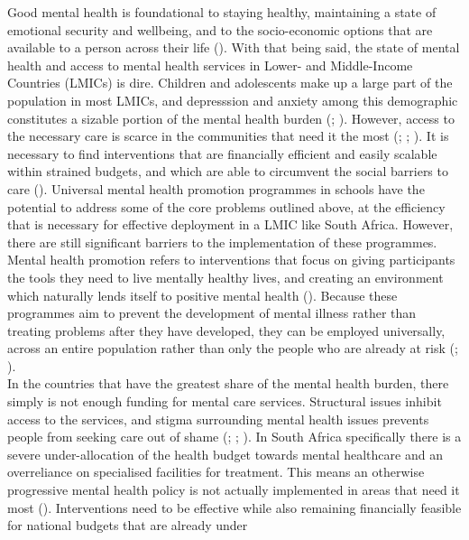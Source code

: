 \documentclass[fontsize=14bp]{article}
\begin{document}
\noindent
Good mental health is foundational to staying healthy, maintaining a state of
emotional security and wellbeing, and to the socio-economic options that are
available to a person across their life (\cite{barryetal13}). With that being
said, the state of mental health and access to mental health services in Lower-
and Middle-Income Countries (LMICs) is dire. Children and adolescents make up
a large part of the population in most LMICs, and depresssion and anxiety among
this demographic constitutes a sizable portion of the mental health burden
(\cite{barryetal13}; \cite{Oseral21}). However, access to the necessary care is
scarce in the communities that need it the most (\cite{Osetal20b};
\cite{Osetal20}; \cite{Oseral21}). It is necessary to find interventions that
are financially efficient and easily scalable within strained budgets, and
which are able to circumvent the social barriers to care (\cite{Osetal20b}).
Universal mental health promotion programmes in schools have the potential to
address some of the core problems outlined above, at the efficiency that is
necessary for effective deployment in a LMIC like South Africa. However, there
are still significant barriers to the implementation of these programmes. \\
Mental health promotion refers to interventions that focus on giving
participants the tools they need to live mentally healthy lives, and creating
an environment which naturally lends itself to positive mental health
(\cite{oretal18}). Because these programmes aim to prevent the development of
mental illness rather than treating problems after they have developed, they
can be employed universally, across an entire population rather than
only the people who are already at risk (\cite{Osetal20}; \cite{riduvetal11}). \\
In the countries that have the greatest share of the mental health burden,
there simply is not enough funding for mental care services. Structural issues
inhibit access to the services, and stigma surrounding mental health issues
prevents people from seeking care out of shame (\cite{barryetal13};
\cite{oretal18}; \cite{Osetal20b}). In South Africa specifically there is a
severe under-allocation of the health budget towards mental healthcare and an
overreliance on specialised facilities for treatment. This means an otherwise
progressive mental health policy is not actually implemented in areas that need
it most (\cite{docetal19}). Interventions need to be effective while also
remaining financially feasible for national budgets that are already under
\end{document}
